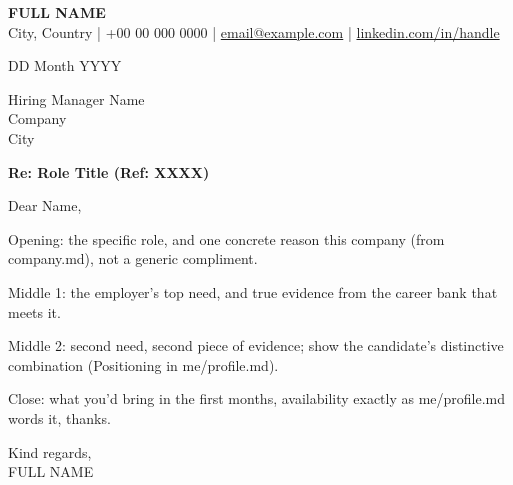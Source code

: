\documentclass[11pt,a4paper]{article}
\begin{document}
{\Large\bfseries\color{accent} FULL NAME}\\
City, Country \;|\; +00 00 000 0000 \;|\; \href{mailto:email@example.com}{email@example.com} \;|\; \href{https://linkedin.com/in/handle}{linkedin.com/in/handle}

\vspace{10pt}
DD Month YYYY

Hiring Manager Name\\
Company\\
City

\textbf{Re: Role Title (Ref: XXXX)}

Dear Name,

Opening: the specific role, and one concrete reason this company (from company.md), not a generic compliment.

Middle 1: the employer's top need, and true evidence from the career bank that meets it.

Middle 2: second need, second piece of evidence; show the candidate's distinctive combination (Positioning in me/profile.md).

Close: what you'd bring in the first months, availability exactly as me/profile.md words it, thanks.

Kind regards,\\
FULL NAME
\end{document}
